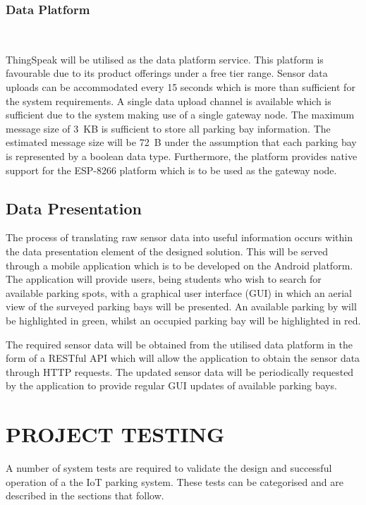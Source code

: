 \documentclass[10pt,twocolumn]{witseiepaper}
\begin{document}
	\subsubsection{Data Platform} $   $
	
		ThingSpeak will be utilised as the data platform service. This platform is favourable due to its product offerings under a free tier range. Sensor data uploads can be accommodated every 15 seconds which is more than sufficient for the system requirements. A single data upload channel is available which is sufficient due to the system making use of a single gateway node. The maximum message size of 3~KB is sufficient to store all parking bay information. The estimated message size will be 72~B under the assumption that each parking bay is represented by a boolean data type. Furthermore, the platform provides native support for the ESP-8266 platform which is to be used as the gateway node.

	\subsection{Data Presentation}
	
		The process of translating raw sensor data into useful information occurs within the data presentation element of the designed solution. This will be served through a mobile application which is to be developed on the Android platform. The application will provide users, being students who wish to search for available parking spots, with a graphical user interface (GUI) in which an aerial view of the surveyed parking bays will be presented. An available parking by will be highlighted in green, whilst an occupied parking bay will be highlighted in red.

		The required sensor data will be obtained from the utilised data platform in the form of a RESTful API which will allow the application to obtain the sensor data through HTTP requests. The updated sensor data will be periodically requested by the application to provide regular GUI updates of available parking bays.
	
\section{PROJECT TESTING}
	A number of system tests are required to validate the design and successful operation of a the IoT parking system. These tests can be categorised and are described in the sections that follow.
\end{document}
